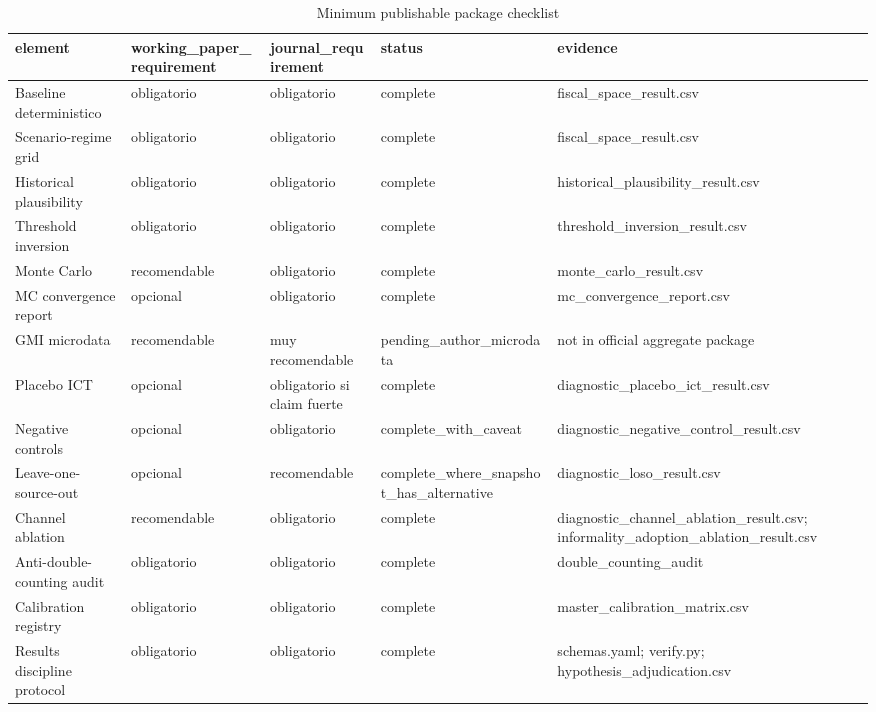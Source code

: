 \begin{table}[!htbp]
\centering
\caption{Minimum publishable package checklist}
\begin{tabular}{lllll}
\toprule
element & working\_paper\_requirement & journal\_requirement & status & evidence \\
\midrule
Baseline deterministico & obligatorio & obligatorio & complete & fiscal\_space\_result.csv \\
Scenario-regime grid & obligatorio & obligatorio & complete & fiscal\_space\_result.csv \\
Historical plausibility & obligatorio & obligatorio & complete & historical\_plausibility\_result.csv \\
Threshold inversion & obligatorio & obligatorio & complete & threshold\_inversion\_result.csv \\
Monte Carlo & recomendable & obligatorio & complete & monte\_carlo\_result.csv \\
MC convergence report & opcional & obligatorio & complete & mc\_convergence\_report.csv \\
GMI microdata & recomendable & muy recomendable & pending\_author\_microdata & not in official aggregate package \\
Placebo ICT & opcional & obligatorio si claim fuerte & complete & diagnostic\_placebo\_ict\_result.csv \\
Negative controls & opcional & obligatorio & complete\_with\_caveat & diagnostic\_negative\_control\_result.csv \\
Leave-one-source-out & opcional & recomendable & complete\_where\_snapshot\_has\_alternative & diagnostic\_loso\_result.csv \\
Channel ablation & recomendable & obligatorio & complete & diagnostic\_channel\_ablation\_result.csv; informality\_adoption\_ablation\_result.csv \\
Anti-double-counting audit & obligatorio & obligatorio & complete & double\_counting\_audit \\
Calibration registry & obligatorio & obligatorio & complete & master\_calibration\_matrix.csv \\
Results discipline protocol & obligatorio & obligatorio & complete & schemas.yaml; verify.py; hypothesis\_adjudication.csv \\
\bottomrule
\end{tabular}
\end{table}
